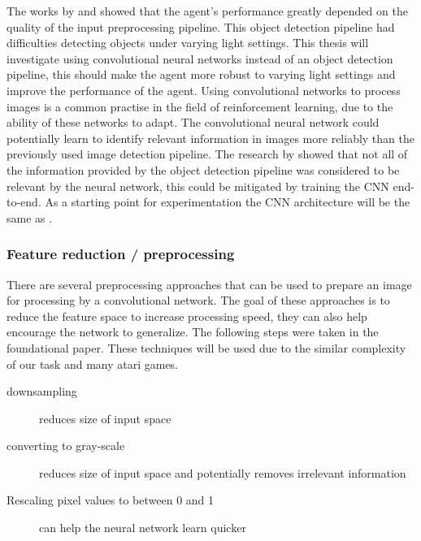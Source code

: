 The works by \autocite{merlin_flach} and \autocite{maximilian} showed that the agent's performance greatly depended on the quality of the input preprocessing pipeline. This object detection pipeline had difficulties detecting objects under varying light settings. This thesis will investigate using convolutional neural networks instead of an object detection pipeline, this should make the agent more robust to varying light settings and improve the performance of the agent.
Using convolutional networks to process images is a common practise in the field of reinforcement learning, due to the ability of these networks to adapt. The convolutional neural network could potentially learn to identify relevant information in images more reliably than the previously used image detection pipeline. The research by \autocite{merlin_flach} showed that not all of the information provided by the object detection pipeline was considered to be relevant by the neural network, this could be mitigated by training the CNN end-to-end.
As a starting point for experimentation the CNN architecture will be the same as \autocite{human_level_control}.




\subsubsection{Feature reduction / preprocessing}

There are several preprocessing approaches that can be used to prepare an image for processing by a convolutional network. The goal of these approaches is to reduce the feature space to increase processing speed, they can also help encourage the network to generalize. The following steps were taken in the foundational \autocite{atari} paper. These techniques will be used due to the similar complexity of our task and many atari games.

\begin{description}
     \item[downsampling] reduces size of input space
     \item[converting to gray-scale] reduces size of input space and potentially removes irrelevant information
     \item[Rescaling pixel values to between 0 and 1] can help the neural network learn quicker %
\end{description}


